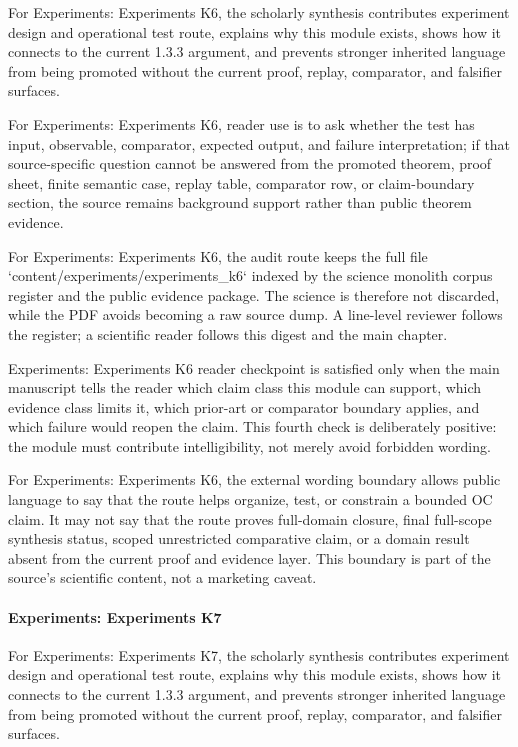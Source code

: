 For Experiments: Experiments K6, the scholarly synthesis contributes experiment design and operational test route, explains why this module exists, shows how it connects to the current 1.3.3 argument, and prevents stronger inherited language from being promoted without the current proof, replay, comparator, and falsifier surfaces.


For Experiments: Experiments K6, reader use is to ask whether the test has input, observable, comparator, expected output, and failure interpretation; if that source-specific question cannot be answered from the promoted theorem, proof sheet, finite semantic case, replay table, comparator row, or claim-boundary section, the source remains background support rather than public theorem evidence.


For Experiments: Experiments K6, the audit route keeps the full file `content/experiments/experiments\_k6` indexed by the science monolith corpus register and the public evidence package. The science is therefore not discarded, while the PDF avoids becoming a raw source dump. A line-level reviewer follows the register; a scientific reader follows this digest and the main chapter.


Experiments: Experiments K6 reader checkpoint is satisfied only when the main manuscript tells the reader which claim class this module can support, which evidence class limits it, which prior-art or comparator boundary applies, and which failure would reopen the claim. This fourth check is deliberately positive: the module must contribute intelligibility, not merely avoid forbidden wording.


For Experiments: Experiments K6, the external wording boundary allows public language to say that the route helps organize, test, or constrain a bounded OC claim. It may not say that the route proves full-domain closure, final full-scope synthesis status, scoped unrestricted comparative claim, or a domain result absent from the current proof and evidence layer. This boundary is part of the source's scientific content, not a marketing caveat.


\paragraph{Experiments: Experiments K7}

For Experiments: Experiments K7, the scholarly synthesis contributes experiment design and operational test route, explains why this module exists, shows how it connects to the current 1.3.3 argument, and prevents stronger inherited language from being promoted without the current proof, replay, comparator, and falsifier surfaces.



